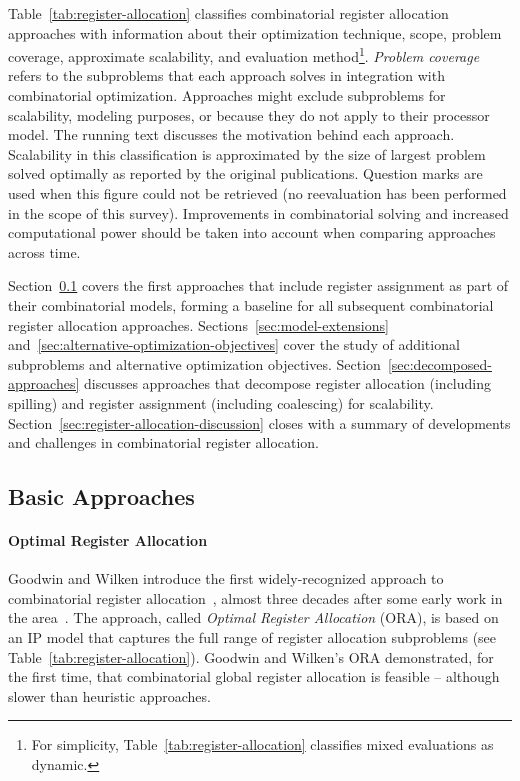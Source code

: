 \documentclass[acmsmall,authorversion,nonacm]{acmart}
\begin{document}
Table~\ref{tab:register-allocation} classifies combinatorial register
allocation approaches with information about their optimization
technique, scope, problem
coverage, approximate scalability, and evaluation method\footnote{For simplicity, Table~\ref{tab:register-allocation} classifies mixed evaluations as
  dynamic.}.
\emph{Problem coverage} refers to the subproblems that each approach
solves in integration with combinatorial optimization.
Approaches might exclude subproblems for scalability, modeling
purposes, or because they do not apply to their processor model.
The running text discusses the motivation behind each approach.
Scalability in this classification is approximated by the size of
largest problem solved optimally as reported by the original
publications.
Question marks are used when this figure could not be retrieved (no
reevaluation has been performed in the scope of this survey).
Improvements in combinatorial solving and increased computational
power should be taken into account when comparing approaches across
time.

Section~\ref{sec:basic-approaches} covers the first approaches that
include register assignment as part of their combinatorial models,
forming a baseline for all subsequent combinatorial register
allocation approaches.
Sections~\ref{sec:model-extensions}
and~\ref{sec:alternative-optimization-objectives} cover the study of
additional subproblems and alternative optimization objectives.
Section~\ref{sec:decomposed-approaches} discusses approaches that
decompose register allocation (including spilling) and register
assignment (including coalescing) for scalability.
Section~\ref{sec:register-allocation-discussion} closes with a summary
of developments and challenges in combinatorial register allocation.

\subsection{Basic Approaches}
\label{sec:basic-approaches}

\paragraph{Optimal Register Allocation}
Goodwin and Wilken introduce the first widely-recognized approach to
combinatorial register allocation~\cite{Goodwin1996}, almost three
decades after some early work in the area~\cite{Day1970,Luque1984}.
The approach, called \emph{Optimal Register Allocation} (ORA), is
based on an IP model that captures the full range of register
allocation subproblems (see Table~\ref{tab:register-allocation}).
Goodwin and Wilken's ORA demonstrated, for the first time, that
combinatorial global register allocation is feasible -- although
slower than heuristic approaches.
\end{document}
